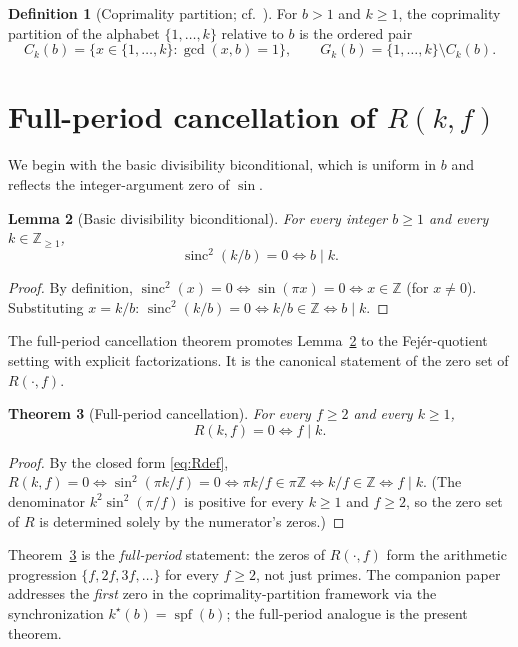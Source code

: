 \documentclass[11pt,reqno]{amsart}
\theoremstyle{plain}
\newtheorem{theorem}{Theorem}[section]
\newtheorem{lemma}[theorem]{Lemma}
\theoremstyle{definition}
\newtheorem{definition}[theorem]{Definition}
\theoremstyle{remark}
\DeclareMathOperator{\sinc}{sinc}
\DeclareMathOperator{\spf}{spf}
\newcommand{\Z}{\mathbb{Z}}
\begin{document}
\begin{definition}[Coprimality partition; cf.~\cite{SandersGish2026FirstG}]\label{def:partition}
For $b > 1$ and $k \ge 1$, the coprimality partition of the alphabet
$\{1, \ldots, k\}$ relative to $b$ is the ordered pair
\[
  C_{k}(b) = \{x \in \{1, \ldots, k\} : \gcd(x, b) = 1\},
  \qquad
  G_{k}(b) = \{1, \ldots, k\} \setminus C_{k}(b).
\]
\end{definition}

\section{Full-period cancellation of $R(k, f)$}\label{sec:fullperiod}

We begin with the basic divisibility biconditional, which is uniform
in $b$ and reflects the integer-argument zero of $\sin$.

\begin{lemma}[Basic divisibility biconditional]\label{lem:basic}
For every integer $b \ge 1$ and every $k \in \Z_{\ge 1}$,
\[
  \sinc^{2}(k/b) = 0 \iff b \mid k.
\]
\end{lemma}

\begin{proof}
By definition, $\sinc^{2}(x) = 0 \iff \sin(\pi x) = 0 \iff x \in \Z$
(for $x \ne 0$). Substituting $x = k/b$: $\sinc^{2}(k/b) = 0 \iff
k/b \in \Z \iff b \mid k$.
\end{proof}

The full-period cancellation theorem promotes Lemma~\ref{lem:basic}
to the Fej\'er-quotient setting with explicit factorizations. It is
the canonical statement of the zero set of $R(\cdot, f)$.

\begin{theorem}[Full-period cancellation]\label{thm:fullperiod}
For every $f \ge 2$ and every $k \ge 1$,
\[
  R(k, f) = 0 \iff f \mid k.
\]
\end{theorem}

\begin{proof}
By the closed form \eqref{eq:Rdef}, $R(k, f) = 0 \iff
\sin^{2}(\pi k/f) = 0 \iff \pi k/f \in \pi \Z \iff k/f \in \Z \iff
f \mid k$. (The denominator $k^{2} \sin^{2}(\pi/f)$ is positive for
every $k \ge 1$ and $f \ge 2$, so the zero set of $R$ is determined
solely by the numerator's zeros.)
\end{proof}

Theorem~\ref{thm:fullperiod} is the \emph{full-period} statement: the
zeros of $R(\cdot, f)$ form the arithmetic progression
$\{f, 2f, 3f, \ldots\}$ for every $f \ge 2$, not just primes. The
companion paper \cite{SandersGish2026FirstG} addresses the
\emph{first} zero in the coprimality-partition framework via the
synchronization $k^{\star}(b) = \spf(b)$; the full-period analogue is
the present theorem.
\end{document}
